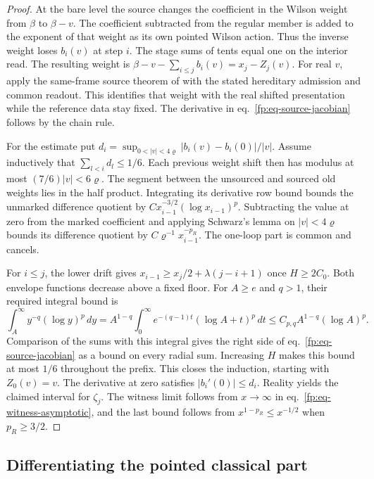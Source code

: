 \documentclass[11pt,letterpaper,reqno]{amsart}
\numberwithin{equation}{section}
\renewcommand{\eqref}[1]{\textup{eq.~\ref{#1}}}
\theoremstyle{definition}
\theoremstyle{remark}
\begin{document}
\begin{proof}
At the bare level the source changes the coefficient in the Wilson
weight from \(\beta\) to \(\beta-v\). The coefficient subtracted
from the regular member is added to the exponent of that weight
as its own pointed Wilson action. Thus the inverse weight loses
\(b_i(v)\) at step \(i\). The stage sums of tents equal one on
the interior read. The resulting weight is
\(\beta-v-\sum_{i\le j}b_i(v)=x_j-Z_j(v)\).
For real \(v\), apply the same-frame source theorem of \cite{SI}
with the stated hereditary admission and common readout. This
identifies that weight with the real shifted presentation while
the reference data stay fixed. The derivative in
\eqref{fp:eq-source-jacobian} follows by the chain rule.

For the estimate put
\(d_i=\sup_{0<|v|<4\varrho}|b_i(v)-b_i(0)|/|v|\).
Assume inductively that \(\sum_{l<i}d_l\le1/6\). Each previous
weight shift then has modulus at most \((7/6)|v|<6\varrho\).
The segment between the unsourced and sourced old weights lies
in the half product. Integrating its derivative row bound
bounds the unmarked difference quotient by
\(C x_{i-1}^{-3/2}(\log x_{i-1})^p\).
Subtracting the value at zero from the marked coefficient and
applying Schwarz's lemma on \(|v|<4\varrho\) bounds its difference
quotient by \(C\varrho^{-1}x_{i-1}^{-p_R}\). The one-loop part is
common and cancels.

For \(i\le j\), the lower drift gives
\(x_{i-1}\ge x_j/2+\lambda(j-i+1)\) once \(H\ge2C_0\).
Both envelope functions decrease above a fixed floor.
For \(A\ge e\) and \(q>1\), their required integral bound is
\[
 \int_A^\infty y^{-q}(\log y)^p\,dy
 =A^{1-q}\int_0^\infty e^{-(q-1)t}(\log A+t)^p\,dt
 \le C_{p,q} A^{1-q}(\log A)^p .
\]
Comparison of the sums with this integral gives the right side
of \eqref{fp:eq-source-jacobian} as a bound on every radial sum.
Increasing \(H\) makes this bound at most \(1/6\) throughout the
prefix. This closes the induction, starting with \(Z_0(v)=v\).
The derivative at zero satisfies \(|b_i'(0)|\le d_i\).
Reality yields the claimed interval for \(\zeta_j\). The witness
limit follows from \(x\to\infty\) in
\eqref{fp:eq-witness-asymptotic}, and the last bound follows from
\(x^{1-p_R}\le x^{-1/2}\) when \(p_R\ge3/2\).
\end{proof}

\subsection{Differentiating the pointed classical part}
\end{document}
